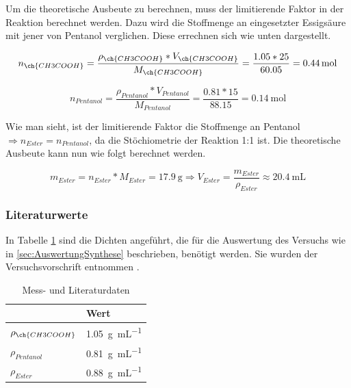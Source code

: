 \documentclass{article}
\begin{document}
        Um die theoretische Ausbeute zu berechnen, muss der limitierende Faktor in der Reaktion berechnet werden. Dazu wird die Stoffmenge an eingesetzter Essigsäure mit jener von Pentanol verglichen. Diese errechnen sich wie unten dargestellt.
        
        \begin{equation}
          n_{\ch{CH3COOH}} = \frac{\rho_{\ch{CH3COOH}} * V_{\ch{CH3COOH}}}{M_{\ch{CH3COOH}}} = \frac{1.05 * 25}{60.05} = \SI[mode=text]{0.44}{\mole}   
        \end{equation}
        
        \begin{equation}
          n_{Pentanol} = \frac{\rho_{Pentanol} * V_{Pentanol}}{M_{Pentanol}} = \frac{0.81 * 15}{88.15} = \SI[mode=text]{0.14}{\mole}   
        \end{equation}
        
        Wie man sieht, ist der limitierende Faktor die Stoffmenge an Pentanol $\Rightarrow n_{Ester} = n_{Pentanol}$, da die Stöchiometrie der Reaktion 1:1 ist. Die theoretische Ausbeute kann nun wie folgt berechnet werden.
        
        \begin{equation}
          m_{Ester} = n_{Ester} * M_{Ester} = \SI[mode=text]{17.9}{\gram} \Rightarrow V_{Ester} = \frac{m_{Ester}}{\rho_{Ester}} \approx \SI[mode=text]{20.4}{\milli\liter}
        \end{equation}
      
      \subsubsection{Literaturwerte}
    
        In Tabelle \ref{tab:Messdaten} sind die Dichten angeführt, die für die Auswertung des Versuchs wie in  \ref{sec:AuswertungSynthese} beschrieben, benötigt werden. Sie wurden der Versuchsvorschrift entnommen \citep{Versuchsvorschrift}.
      
        \begin{table}[H]
          \centering
          \caption[Mess- und Literaturdaten, Quelle: Autor]{Mess- und Literaturdaten}
          \label{tab:Messdaten}
          \begin{tabular}{@{}ll@{}}
            \toprule
              & Wert \\ \midrule
             $\rho_{\ch{CH3COOH}}$ & \SI[mode=text]{1.05}{\gram\per\milli\liter} \\
             $\rho_{Pentanol}$ & \SI[mode=text]{0.81}{\gram\per\milli\liter} \\
             $\rho_{Ester}$ & \SI[mode=text]{0.88}{\gram\per\milli\liter} \\ \bottomrule
          \end{tabular}
      \end{table}      
     
\end{document}
